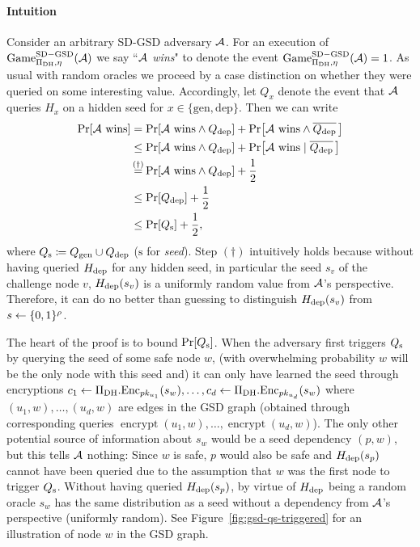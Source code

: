\paragraph{Intuition}
Consider an arbitrary SD-GSD adversary $\mathcal{A}$. For an execution of $\mathrm{Game}_{\Pi_{\mathrm{DH}}, \eta}^{\mathrm{SD-GSD}}(\mathcal{A})$ we say ``\emph{$\mathcal{A}$ wins}" to denote the event $\mathrm{Game}_{\Pi_{\mathrm{DH}}, \eta}^{\mathrm{SD-GSD}}(\mathcal{A}) = 1$.
As usual with random oracles we proceed by a case distinction on whether they were queried on some interesting value. Accordingly, let $Q_{x}$ denote the event that $\mathcal{A}$ queries $H_{x}$ on a hidden seed for $x \in \{\mathrm{gen}, \mathrm{dep}\}$. Then we can write
\begin{align} \label{eq:theorem-sd-gsd-security-win-cases}
	\begin{split}
		\pr{\wins} & = \pr{\wins \land \qdep} + \pr{\wins \land \overline{\qdep} \,} \\
		& \le \pr{\wins \land \qdep} + \pr{\wins \mid \overline{\qdep} \,} \\
		& \stackrel{\mathclap{(\dagger)}}{=}  \pr{\wins \land \qdep} + \frac{1}{2}         \\
		& \le \pr{\qdep} + \frac{1}{2} \\
		& \le \pr{\qs} + \frac{1}{2},
	\end{split}
\end{align}
where $Q_\mathrm{s} \coloneqq Q_\mathrm{gen} \cup Q_\mathrm{dep}$ ($\mathrm{s}$ for \emph{seed}). Step $(\dagger)$ intuitively holds because without having queried $H_\mathrm{dep}$ for any hidden seed, in particular the seed $s_v$ of the challenge node $v$, $H_\mathrm{dep}(s_v)$ is a uniformly random value from $\mathcal{A}$'s perspective. Therefore, it can do no better than guessing to distinguish $H_\mathrm{dep}(s_v)$ from $s \leftarrow \{0, 1\}^\rho$.


The heart of the proof is to bound $\pr{\qs}$. When the adversary first triggers $Q_\mathrm{s}$ by querying the seed of some safe node $w$, (with overwhelming probability $w$ will be the only node with this seed and) it can only have learned the seed through encryptions
$c_1 \leftarrow \Pi_{\mathrm{DH}}.\mathrm{Enc}_{pk_{u_1}}(s_w), \ldots, c_d \leftarrow \Pi_{\mathrm{DH}}.\mathrm{Enc}_{pk_{u_d}}(s_w)$
where $(u_1, w), \ldots, (u_d, w)$ are edges in the GSD graph (obtained through corresponding queries $\operatorname{encrypt}(u_1, w), \ldots, \operatorname{encrypt}(u_d, w)$). The only other potential source of information about $s_w$ would be a seed dependency $(p, w)$, but this tells $\mathcal{A}$ nothing: Since $w$ is safe, $p$ would also be safe and $H_\mathrm{dep}(s_p)$ cannot have been queried due to the assumption that $w$ was the first node to trigger $Q_\mathrm{s}$.
Without having queried $H_\mathrm{dep}(s_p)$, by virtue of $H_\mathrm{dep}$ being a random oracle $s_w$ has the same distribution as a seed without a dependency from $\mathcal{A}$'s perspective (uniformly random). See Figure~\ref{fig:gsd-qs-triggered} for an illustration of node $w$ in the GSD graph.

